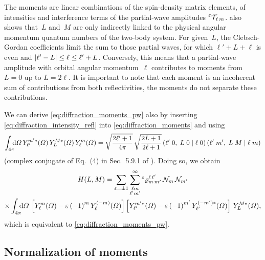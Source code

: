 The moments are linear combinations of the spin-density matrix
elements, \ie of intensities and interference terms of the
partial-wave amplitudes $\prescript{\ensuremath{\varepsilon}}{}{\mathcal{T\!}}_{\ell\,
m}$.   also shows that~$L$ and~$M$ are
only indirectly linked to the physical angular momentum quantum
numbers of the two-body system.  For given~$L$, the Clebsch-Gordan
coefficients limit the sum to those partial waves, for which $\ell' +
L + \ell$ is even and $\vert{\ell' - L}\vert \leq \ell \leq \ell' + L$.
Conversely, this means that a partial-wave amplitude with orbital
angular momentum~$\ell$ contributes to moments from $L = 0$ up to $L =
2 \ell$.  It is important to note that each moment is an incoherent
sum of contributions from both reflectivities, \ie the moments do not
separate these contributions.

We can derive \cref{eq:diffraction_moments_pw} also by inserting
\cref{eq:diffraction_intensity_refl} into
\cref{eq:diffraction_moments} and using
\begin{equation}
  \label{eq:spherical_harm_clebsch}
  \int_{4 \pi}\!\!\! \dif{\Omega}\,
  Y_{\ell'}^{m' *}(\Omega)\, Y_L^{M *}(\Omega)\, Y_{\ell}^m(\Omega)
  = \sqrt{\frac{2 \ell' + 1}{4 \pi}}\, \sqrt{\frac{2 L + 1}{2 \ell + 1}}\, \clebsch{\ell'}{0}{L}{0}{\ell}{0}\, \clebsch{\ell'}{m'}{L}{M}{\ell}{m}
\end{equation}
(complex conjugate of Eq.~(4) in Sec.~5.9.1 of
).  Doing so, we obtain
\begin{multline}
  \label{eq:diffraction_moments_pw_refl}
  H(L, M)
  = \sum_{\refl = \pm 1} \sum_{\substack{\ell m \\ \ell' m'}}^\infty
  \prescript{\refl}{}{\varrho}^{\ell\, \ell'}_{m\, m'}\,
  \mathcal{N}_m\, \mathcal{N}_{m'} \\
  \times \int_{4 \pi}\!\!\! \dif{\Omega}\,
  \sBrk[2]{Y_\ell^m(\Omega) - \refl\, {(-1)}^m\, Y_\ell^{(-m)}(\Omega)}
  \sBrk[2]{Y_{\ell'}^{m' *}(\Omega) - \refl\, {(-1)}^{m'}\, Y_{\ell'}^{(-m') *}(\Omega)}\,
  Y_L^{M *}(\Omega),
\end{multline}
which is equivalent to \cref{eq:diffraction_moments_pw}.


\subsection{Normalization of moments}%
\label{sec:diffraction:moments_norm}

